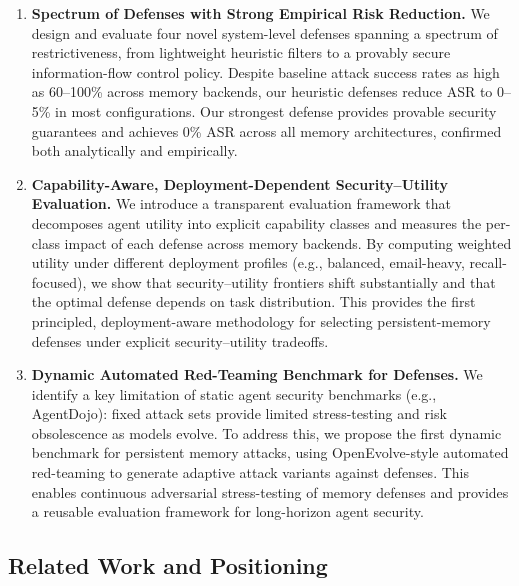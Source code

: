 \documentclass[runningheads]{llncs}
\newenvironment{review}{\color{blue}}{}
\begin{document}
\begin{review}
\begin{enumerate}
    \item \textbf{Spectrum of Defenses with Strong Empirical Risk Reduction.}
    We design and evaluate four novel system-level defenses spanning a spectrum of restrictiveness, from lightweight heuristic filters to a provably secure information-flow control policy. Despite baseline attack success rates as high as 60--100\% across memory backends, our heuristic defenses reduce ASR to 0--5\% in most configurations. Our strongest defense provides provable security guarantees and achieves 0\% ASR across all memory architectures, confirmed both analytically and empirically.
    
    \item \textbf{Capability-Aware, Deployment-Dependent Security--Utility Evaluation.}
    We introduce a transparent evaluation framework that decomposes agent utility into explicit capability classes and measures the per-class impact of each defense across memory backends. By computing weighted utility under different deployment profiles (e.g., balanced, email-heavy, recall-focused), we show that security--utility frontiers shift substantially and that the optimal defense depends on task distribution. This provides the first principled, deployment-aware methodology for selecting persistent-memory defenses under explicit security--utility tradeoffs.
    
    \item \textbf{Dynamic Automated Red-Teaming Benchmark for Defenses.}
    We identify a key limitation of static agent security benchmarks (e.g., AgentDojo): fixed attack sets provide limited stress-testing and risk obsolescence as models evolve. To address this, we propose the first dynamic benchmark for persistent memory attacks, using OpenEvolve-style automated red-teaming to generate adaptive attack variants against defenses. This enables continuous adversarial stress-testing of memory defenses and provides a reusable evaluation framework for long-horizon agent security.
    
    \end{enumerate}

\subsection{Related Work and Positioning}


\end{review}
\end{document}
